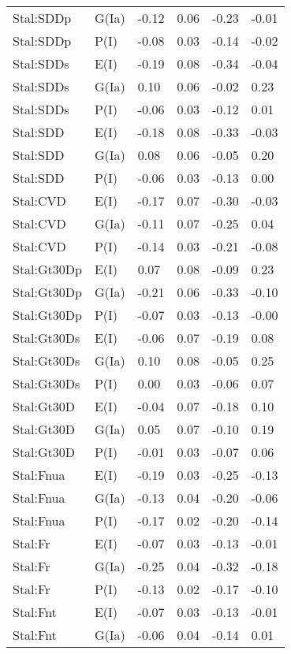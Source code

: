 \begin{center}
\begin{longtable}{|p{1.1in}|p{0.7in}|p{0.7in}|p{0.6in}|p{0.6in}|p{0.6in}|}
  Stal:SDDp & G(Ia) & -0.12 & 0.06 & -0.23 & -0.01 \\ 
  Stal:SDDp & P(I) & -0.08 & 0.03 & -0.14 & -0.02 \\ 
  Stal:SDDs & E(I) & -0.19 & 0.08 & -0.34 & -0.04 \\ 
  Stal:SDDs & G(Ia) & 0.10 & 0.06 & -0.02 & 0.23 \\ 
  Stal:SDDs & P(I) & -0.06 & 0.03 & -0.12 & 0.01 \\ 
  Stal:SDD & E(I) & -0.18 & 0.08 & -0.33 & -0.03 \\ 
  Stal:SDD & G(Ia) & 0.08 & 0.06 & -0.05 & 0.20 \\ 
  Stal:SDD & P(I) & -0.06 & 0.03 & -0.13 & 0.00 \\ 
  Stal:CVD & E(I) & -0.17 & 0.07 & -0.30 & -0.03 \\ 
  Stal:CVD & G(Ia) & -0.11 & 0.07 & -0.25 & 0.04 \\ 
  Stal:CVD & P(I) & -0.14 & 0.03 & -0.21 & -0.08 \\ 
  Stal:Gt30Dp & E(I) & 0.07 & 0.08 & -0.09 & 0.23 \\ 
  Stal:Gt30Dp & G(Ia) & -0.21 & 0.06 & -0.33 & -0.10 \\ 
  Stal:Gt30Dp & P(I) & -0.07 & 0.03 & -0.13 & -0.00 \\ 
  Stal:Gt30Ds & E(I) & -0.06 & 0.07 & -0.19 & 0.08 \\ 
  Stal:Gt30Ds & G(Ia) & 0.10 & 0.08 & -0.05 & 0.25 \\ 
  Stal:Gt30Ds & P(I) & 0.00 & 0.03 & -0.06 & 0.07 \\ 
  Stal:Gt30D & E(I) & -0.04 & 0.07 & -0.18 & 0.10 \\ 
  Stal:Gt30D & G(Ia) & 0.05 & 0.07 & -0.10 & 0.19 \\ 
  Stal:Gt30D & P(I) & -0.01 & 0.03 & -0.07 & 0.06 \\ 
  Stal:Fnua & E(I) & -0.19 & 0.03 & -0.25 & -0.13 \\ 
  Stal:Fnua & G(Ia) & -0.13 & 0.04 & -0.20 & -0.06 \\ 
  Stal:Fnua & P(I) & -0.17 & 0.02 & -0.20 & -0.14 \\ 
  Stal:Fr & E(I) & -0.07 & 0.03 & -0.13 & -0.01 \\ 
  Stal:Fr & G(Ia) & -0.25 & 0.04 & -0.32 & -0.18 \\ 
  Stal:Fr & P(I) & -0.13 & 0.02 & -0.17 & -0.10 \\ 
  Stal:Fnt & E(I) & -0.07 & 0.03 & -0.13 & -0.01 \\ 
  Stal:Fnt & G(Ia) & -0.06 & 0.04 & -0.14 & 0.01 \\ 

\end{longtable}
\end{center}
